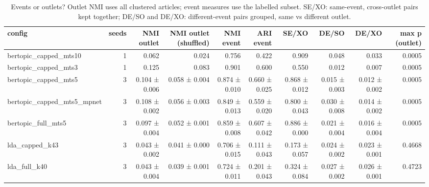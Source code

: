 \begin{table}[t]
\centering
\small
\begin{tabular}{lrrrrrrrrr}
\hline
config & seeds & NMI outlet & NMI outlet (shuffled) & NMI event & ARI event & SE/XO & DE/SO & DE/XO & max p (outlet) \\
\hline
bertopic\_capped\_mts10 & 1 & 0.062 & 0.024 & 0.756 & 0.422 & 0.909 & 0.048 & 0.033 & 0.0005 \\
bertopic\_capped\_mts3 & 1 & 0.125 & 0.083 & 0.901 & 0.600 & 0.550 & 0.012 & 0.007 & 0.0005 \\
bertopic\_capped\_mts5 & 3 & 0.104 ± 0.006 & 0.058 ± 0.004 & 0.874 ± 0.010 & 0.660 ± 0.025 & 0.868 ± 0.012 & 0.015 ± 0.003 & 0.012 ± 0.002 & 0.0005 \\
bertopic\_capped\_mts5\_mpnet & 3 & 0.108 ± 0.002 & 0.056 ± 0.003 & 0.849 ± 0.013 & 0.559 ± 0.020 & 0.800 ± 0.043 & 0.030 ± 0.008 & 0.014 ± 0.002 & 0.0005 \\
bertopic\_full\_mts5 & 3 & 0.097 ± 0.004 & 0.052 ± 0.001 & 0.859 ± 0.008 & 0.607 ± 0.042 & 0.886 ± 0.000 & 0.021 ± 0.004 & 0.016 ± 0.004 & 0.0005 \\
lda\_capped\_k43 & 3 & 0.043 ± 0.002 & 0.041 ± 0.000 & 0.706 ± 0.015 & 0.111 ± 0.043 & 0.173 ± 0.057 & 0.024 ± 0.002 & 0.023 ± 0.001 & 0.4668 \\
lda\_full\_k40 & 3 & 0.043 ± 0.004 & 0.039 ± 0.001 & 0.724 ± 0.011 & 0.201 ± 0.043 & 0.324 ± 0.084 & 0.027 ± 0.002 & 0.026 ± 0.001 & 0.4723 \\
\hline
\end{tabular}
\caption{Events or outlets? Outlet NMI uses all clustered articles; event measures use the labelled subset. SE/XO: same-event, cross-outlet pairs kept together; DE/SO and DE/XO: different-event pairs grouped, same vs different outlet.}
\label{tab:v2eval}
\end{table}
